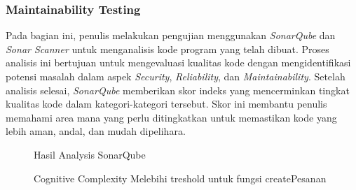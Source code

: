 \subsubsection{Maintainability Testing}
Pada bagian ini, penulis melakukan pengujian menggunakan \textit{SonarQube} dan \textit{Sonar Scanner} untuk menganalisis kode program yang telah dibuat. Proses analisis ini bertujuan untuk mengevaluasi kualitas kode dengan mengidentifikasi potensi masalah dalam aspek \textit{Security}, \textit{Reliability}, dan \textit{Maintainability}. Setelah analisis selesai, \textit{SonarQube} memberikan skor indeks yang mencerminkan tingkat kualitas kode dalam kategori-kategori tersebut. Skor ini membantu penulis memahami area mana yang perlu ditingkatkan untuk memastikan kode yang lebih aman, andal, dan mudah dipelihara.
\begin{figure}[H]
  {\par}
  \caption{Hasil Analysis SonarQube}
  \label{maintainability-testing-1}
\end{figure}
\begin{figure}[H]
  {\par}
  \caption{Cognitive Complexity Melebihi treshold untuk fungsi createPesanan}
  \label{maintainability-testing-2}
\end{figure}

